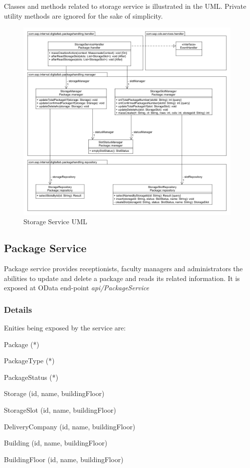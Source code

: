 Classes and methods related to storage service is illustrated in the UML. Private utility methods are ignored for the sake of simplicity.
\begin{figure}
    \centering
    \includegraphics[width=1\linewidth]{images/service_class_diagrams/storage_service_class_diagram.png}
    \caption{Storage Service UML}
    \label{fig:storage_service_uml}
\end{figure}

\subsection{Package Service}
Package service provides receptionists, faculty managers and administrators the abilities to update and delete a package and reads its related information. It is exposed at OData end-point \textit{api/PackageService} 

\subsubsection{Details}

Enities being exposed by the service are:
\begin{compactenum}
	\item Package (*)
    \item PackageType (*)
    \item PackageStatus (*)
    \item Storage (id, name, buildingFloor)
    \item StorageSlot (id, name, buildingFloor)
    \item DeliveryCompany (id, name, buildingFloor)
    \item Building (id, name, buildingFloor)
    \item BuildingFloor (id, name, buildingFloor)
\end{compactenum}

